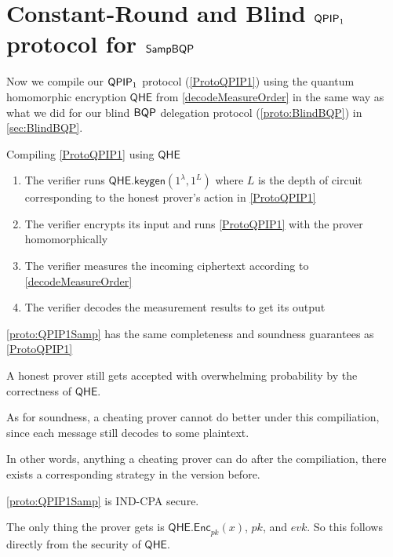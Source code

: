\section{Constant-Round and Blind $\operatorname{\mathsf{QPIP}}_1$ protocol for $\operatorname{\mathsf{SampBQP}}$}

Now we compile our $\operatorname{\mathsf{QPIP}}_1$ protocol (\cref{ProtoQPIP1}) using the quantum homomorphic encryption $\mathsf{QHE}$ from \cref{decodeMeasureOrder} in the same way as what we did for our blind $\operatorname{\mathsf{BQP}}$ delegation protocol (\cref{proto:BlindBQP}) in \cref{sec:BlindBQP}.

\begin{protocol}{Compiling \cref{ProtoQPIP1} using $\mathsf{QHE}$}
	\label{proto:QPIP1Samp}
	\begin{enumerate}
		\item The verifier runs $\mathsf{QHE.keygen}(1^\lambda, 1^L)$ where $L$ is the depth of circuit corresponding to the honest prover's action in \cref{ProtoQPIP1}
		\item The verifier encrypts its input and runs \cref{ProtoQPIP1} with the prover homomorphically
		\item The verifier measures the incoming ciphertext according to \cref{decodeMeasureOrder}
		\item The verifier decodes the measurement results to get its output
	\end{enumerate}
\end{protocol}

\begin{thm}
	\cref{proto:QPIP1Samp} has the same completeness and soundness guarantees as \cref{ProtoQPIP1}
\end{thm}
\begin{prf}
	A honest prover still gets accepted with overwhelming probability by the correctness of $\mathsf{QHE}$. 

	As for soundness, a cheating prover cannot do better under this compiliation, since each message still decodes to some plaintext.

	In other words, anything a cheating prover can do after the compiliation, there exists a corresponding strategy in the version before.
\end{prf}

\begin{thm}
	\cref{proto:QPIP1Samp} is IND-CPA secure.
\end{thm}
\begin{prf}
	The only thing the prover gets is $\mathsf{QHE.Enc}_{pk}(x)$, $pk$, and $evk$. So this follows directly from the security of $\mathsf{QHE}$.
\end{prf}
